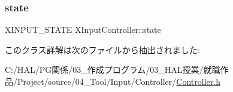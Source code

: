 \mbox{\label{class_x_input_controller_a36c0a2bb42c5559460653772a6ec26d1}} 
\subsubsection{\texorpdfstring{state}{state}}
{\footnotesize\ttfamily X\+I\+N\+P\+U\+T\+\_\+\+S\+T\+A\+TE X\+Input\+Controller\+::state}



このクラス詳解は次のファイルから抽出されました\+:\begin{DoxyCompactItemize}
\item 
C\+:/\+H\+A\+L/\+P\+G関係/03\+\_\+作成プログラム/03\+\_\+\+H\+A\+L授業/就職作品/\+Project/source/04\+\_\+\+Tool/\+Input/\+Controller/\mbox{\hyperlink{_controller_8h}{Controller.\+h}}\end{DoxyCompactItemize}
